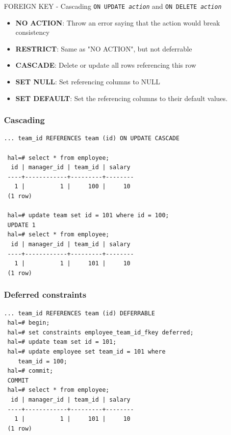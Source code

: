 \documentclass{beamer}
\begin{document}
\begin{frame}{FOREIGN KEY - Cascading}
    \texttt{ON UPDATE \emph{action}} and \texttt{ON DELETE \emph{action}}
    \begin{itemize}
        \item {\bf NO ACTION}: Throw an error saying that the action would break consistency
        \item {\bf RESTRICT}: Same as "NO ACTION", but not deferrable
        \item {\bf CASCADE}: Delete or update all rows referencing this row
        \item {\bf SET NULL}: Set referencing columns to NULL
        \item {\bf SET DEFAULT}: Set the referencing columns to their default values.
    \end{itemize}
\end{frame}

\begin{frame}[fragile]
    \frametitle{Cascading}
    \begin{Verbatim}[fontfamily=courier]
... team_id REFERENCES team (id) ON UPDATE CASCADE

 hal=# select * from employee;
  id | manager_id | team_id | salary
 ----+------------+---------+--------
   1 |          1 |     100 |     10
 (1 row)
 
 hal=# update team set id = 101 where id = 100;
 UPDATE 1
 hal=# select * from employee;
  id | manager_id | team_id | salary
 ----+------------+---------+--------
   1 |          1 |     101 |     10
 (1 row)
    \end{Verbatim}
\end{frame}

\begin{frame}[fragile]
    \frametitle{Deferred constraints}
    \begin{Verbatim}[fontfamily=courier]
 ... team_id REFERENCES team (id) DEFERRABLE
 hal=# begin;
 hal=# set constraints employee_team_id_fkey deferred;
 hal=# update team set id = 101;
 hal=# update employee set team_id = 101 where
    team_id = 100;
 hal=# commit;
 COMMIT
 hal=# select * from employee;
  id | manager_id | team_id | salary
 ----+------------+---------+--------
   1 |          1 |     101 |     10
 (1 row)
    \end{Verbatim}
\end{frame}
\end{document}
